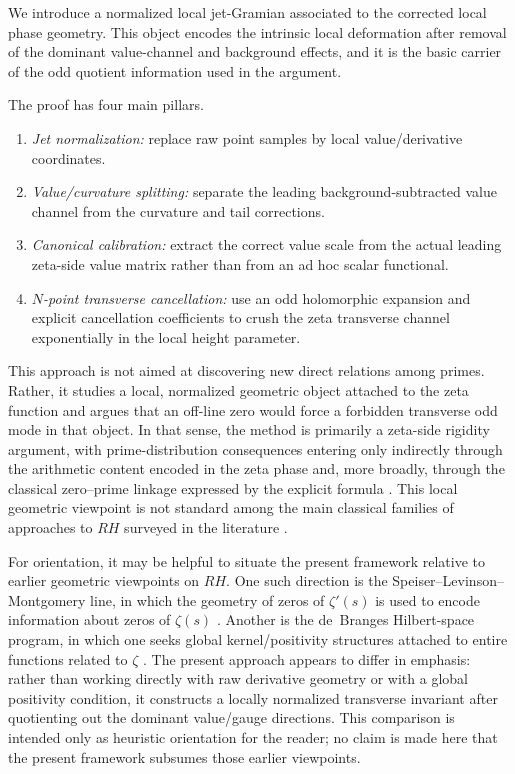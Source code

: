 \documentclass[11pt,a4paper]{amsart}
\def\RH{RH}%
\theoremstyle{plain}
\theoremstyle{definition}
\newcommand{\RH}{\mathrm{RH}}
\begin{document}
We introduce a normalized local jet-Gramian associated to the corrected local phase geometry. This object encodes the intrinsic local deformation after removal of the dominant value-channel and background effects, and it is the basic carrier of the odd quotient information used in the argument.

The proof has four main pillars.
\begin{enumerate}[label=\arabic*.,nosep]
    \item \emph{Jet normalization:} replace raw point samples by local value/derivative coordinates.
    \item \emph{Value/curvature splitting:} separate the leading background-subtracted value channel from the curvature and tail corrections.
    \item \emph{Canonical calibration:} extract the correct value scale from the actual leading zeta-side value matrix rather than from an ad hoc scalar functional.
    \item \emph{$N$-point transverse cancellation:} use an odd holomorphic expansion and explicit cancellation coefficients to crush the zeta transverse channel exponentially in the local height parameter.
\end{enumerate}

This approach is not aimed at discovering new direct relations among primes. Rather, it studies a local, normalized geometric object attached to the zeta function and argues that an off-line zero would force a forbidden transverse odd mode in that object. In that sense, the method is primarily a zeta-side rigidity argument, with prime-distribution consequences entering only indirectly through the arithmetic content encoded in the zeta phase and, more broadly, through the classical zero--prime linkage expressed by the explicit formula \cite{Bombieri2000,Conrey2003,Edwards2001,Titchmarsh1986}. This local geometric viewpoint is not standard among the main classical families of approaches to $\RH$ surveyed in the literature \cite{Bombieri2000,Conrey2003}.

For orientation, it may be helpful to situate the present framework relative to earlier geometric viewpoints on $\RH$. One such direction is the Speiser--Levinson--Montgomery line, in which the geometry of zeros of $\zeta'(s)$ is used to encode information about zeros of $\zeta(s)$ \cite{Speiser1935,LevinsonMontgomery1974}. Another is the de~Branges Hilbert-space program, in which one seeks global kernel/positivity structures attached to entire functions related to $\zeta$ \cite{deBranges1986,ConreyLi2000}. The present approach appears to differ in emphasis: rather than working directly with raw derivative geometry or with a global positivity condition, it constructs a locally normalized transverse invariant after quotienting out the dominant value/gauge directions. This comparison is intended only as heuristic orientation for the reader; no claim is made here that the present framework subsumes those earlier viewpoints.
\end{document}
